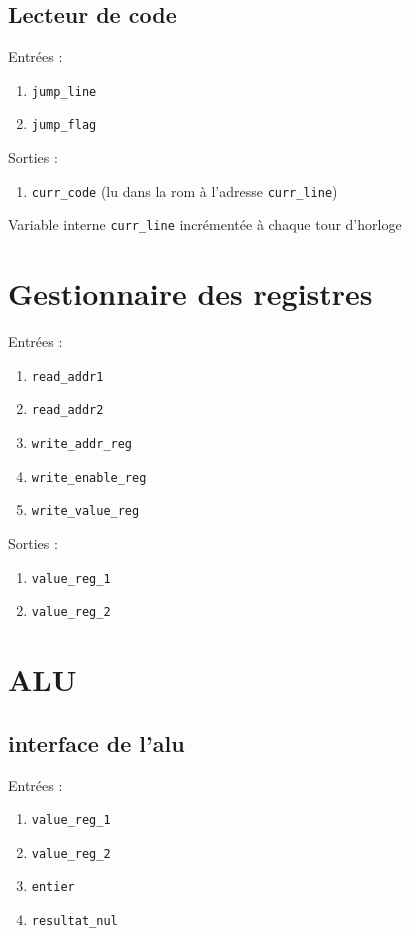 \documentclass{article}
\begin{document}
\subsection{Lecteur de code}

Entrées :
\begin{enumerate}
    \item \texttt{jump\_line}
    \item \texttt{jump\_flag}
\end{enumerate}

Sorties :
\begin{enumerate}
    \item \texttt{curr\_code} (lu dans la rom à l’adresse \texttt{curr\_line})
\end{enumerate}

Variable interne \texttt{curr\_line} incrémentée à chaque tour d’horloge

\section{Gestionnaire des registres}
Entrées :
\begin{enumerate}
    \item \texttt{read\_addr1} 
    \item \texttt{read\_addr2}
    \item \texttt{write\_addr\_reg}
    \item \texttt{write\_enable\_reg}
    \item \texttt{write\_value\_reg}
\end{enumerate}

Sorties : 
\begin{enumerate}
    \item \texttt{value\_reg\_1}
    \item \texttt{value\_reg\_2}
\end{enumerate}


\section{ALU}
\subsection{interface de l’alu}

Entrées :
\begin{enumerate}
    \item \texttt{value\_reg\_1}
    \item \texttt{value\_reg\_2}
    \item \texttt{entier}
    \item \texttt{resultat_nul}
\end{enumerate}
\end{document}
